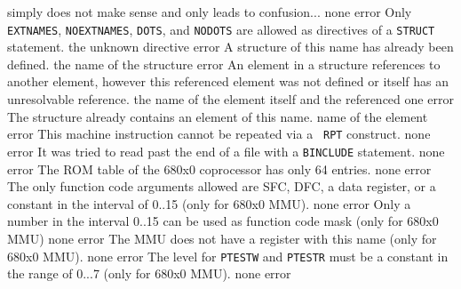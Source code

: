 \documentclass[12pt,twoside]{report}
\newcommand{\tty}[1]{{\tt #1}}
\begin{document}
\begin{description}
{                simply does not make sense and only leads to
                confusion...}
               {none}
\errentry{1554}{invalid \tty{STRUCT} directive}
               {error}
               {Only \tty{EXTNAMES}, \tty{NOEXTNAMES}, \tty{DOTS},
                and \tty{NODOTS} are allowed as directives of a
                \tty{STRUCT} statement.}
               {the unknown directive}
               {error}
               {A structure of this name has already been defined.}
               {the name of the structure}
               {error}
               {An element in a structure references to another
                element, however this referenced element was not
                defined or itself has an unresolvable reference.}
               {the name of the element itself and the referenced one}
               {error}
               {The structure already contains an element of this name.}
               {name of the element}
               {error}
               {This machine instruction cannot be repeated via a {\tt
                RPT} construct.}
               {none}
               {error}
               {It was tried to read past the end of a file with a
                \tty{BINCLUDE} statement.}
               {none}
               {error}
               {The ROM table of the 680x0 coprocessor has only 64 entries.}
               {none}
               {error}
               {The only function code arguments allowed are SFC, DFC, a
                data register, or a constant in the interval of 0..15 (only
                for 680x0 MMU).}
               {none}
               {error}
               {Only a number in the interval 0..15 can be used as
                function code mask (only for 680x0 MMU)}
               {none}
               {error}
               {The MMU does not have a register with this name (only for
                680x0 MMU).}
               {none}
               {error}
               {The level for \tty{PTESTW} and \tty{PTESTR} must be a constant in the
                range of 0...7 (only for 680x0 MMU).}
               {none}
               {error}

\end{description}
\end{document}
